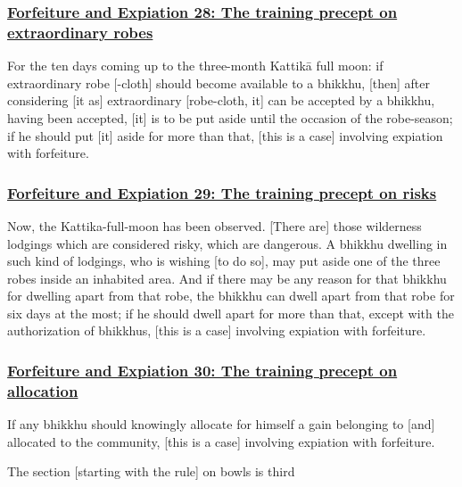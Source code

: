 \subsubsection*{\hyperref[np28]{Forfeiture and Expiation 28: The training precept on extraordinary robes}}
\label{forf-exp28}

For the ten days coming up to the three-month Kattikā full moon: if extraordinary robe [-cloth] should become available to a bhikkhu, [then] after considering [it as] extraordinary [robe-cloth, it] can be accepted by a bhikkhu, having been accepted, [it] is to be put aside until the occasion of the robe-season; if he should put [it] aside for more than that, [this is a case] involving expiation with forfeiture.



\subsubsection*{\hyperref[np29]{Forfeiture and Expiation 29: The training precept on risks}}
\label{forf-exp29}

Now, the Kattika-full-moon has been observed. [There are] those wilderness lodgings which are considered risky, which are dangerous. A bhikkhu dwelling in such kind of lodgings, who is wishing [to do so], may put aside one of the three robes inside an inhabited area. And if there may be any reason for that bhikkhu for dwelling apart from that robe, the bhikkhu can dwell apart from that robe for six days at the most; if he should dwell apart for more than that, except with the authorization of bhikkhus, [this is a case] involving expiation with forfeiture.



\subsubsection*{\hyperref[np30]{Forfeiture and Expiation 30: The training precept on allocation}}
\label{forf-exp30}

If any bhikkhu should knowingly allocate for himself a gain belonging to [and] allocated to the community, [this is a case] involving expiation with forfeiture.

\begin{center}
	The section [starting with the rule] on bowls is third
\end{center}



